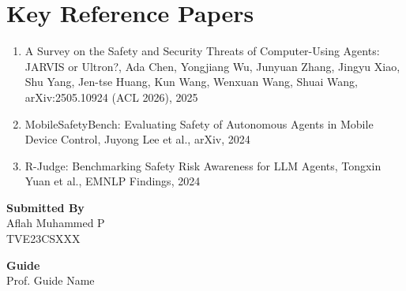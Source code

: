 \documentclass[12pt]{article}
\newcommand{\studentname}{Aflah Muhammed P}
\newcommand{\rollno}{TVE23CSXXX}
\newcommand{\guidename}{Prof. Guide Name}
\begin{document}
\section*{Key Reference Papers}
\begin{enumerate}
  \item A Survey on the Safety and Security Threats of Computer-Using Agents: JARVIS or Ultron?, Ada Chen, Yongjiang Wu, Junyuan Zhang, Jingyu Xiao, Shu Yang, Jen-tse Huang, Kun Wang, Wenxuan Wang, Shuai Wang, arXiv:2505.10924 (ACL 2026), 2025
  \item MobileSafetyBench: Evaluating Safety of Autonomous Agents in Mobile Device Control, Juyong Lee et al., arXiv, 2024
  \item R-Judge: Benchmarking Safety Risk Awareness for LLM Agents, Tongxin Yuan et al., EMNLP Findings, 2024
\end{enumerate}
\vspace{1.5em}

\noindent\textbf{Submitted By}\\
\studentname\\
\rollno

\vspace{1em}
\noindent\textbf{Guide}\\
\guidename
\end{document}
